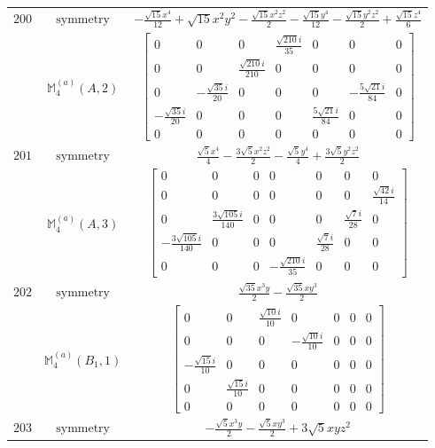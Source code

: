 \documentclass[fleqn,8pt,landscape]{jsarticle}
\begin{document}
\begin{longtable}{ccc}
$ 200 $ & $ \text{symmetry} $ & $ - \frac{\sqrt{15} x^{4}}{12} + \sqrt{15} x^{2} y^{2} - \frac{\sqrt{15} x^{2} z^{2}}{2} - \frac{\sqrt{15} y^{4}}{12} - \frac{\sqrt{15} y^{2} z^{2}}{2} + \frac{\sqrt{15} z^{4}}{6} $ \\
$  $ & $ \mathbb{M}_{4}^{(a)}(A,2) $ & $ \begin{bmatrix} 0 & 0 & 0 & \frac{\sqrt{210} i}{35} & 0 & 0 & 0 \\ 0 & 0 & \frac{\sqrt{210} i}{210} & 0 & 0 & 0 & 0 \\ 0 & - \frac{\sqrt{35} i}{20} & 0 & 0 & 0 & - \frac{5 \sqrt{21} i}{84} & 0 \\ - \frac{\sqrt{35} i}{20} & 0 & 0 & 0 & \frac{5 \sqrt{21} i}{84} & 0 & 0 \\ 0 & 0 & 0 & 0 & 0 & 0 & 0 \end{bmatrix} $ \\ \hline
$ 201 $ & $ \text{symmetry} $ & $ \frac{\sqrt{5} x^{4}}{4} - \frac{3 \sqrt{5} x^{2} z^{2}}{2} - \frac{\sqrt{5} y^{4}}{4} + \frac{3 \sqrt{5} y^{2} z^{2}}{2} $ \\
$  $ & $ \mathbb{M}_{4}^{(a)}(A,3) $ & $ \begin{bmatrix} 0 & 0 & 0 & 0 & 0 & 0 & 0 \\ 0 & 0 & 0 & 0 & 0 & 0 & \frac{\sqrt{42} i}{14} \\ 0 & \frac{3 \sqrt{105} i}{140} & 0 & 0 & 0 & \frac{\sqrt{7} i}{28} & 0 \\ - \frac{3 \sqrt{105} i}{140} & 0 & 0 & 0 & \frac{\sqrt{7} i}{28} & 0 & 0 \\ 0 & 0 & 0 & - \frac{\sqrt{210} i}{35} & 0 & 0 & 0 \end{bmatrix} $ \\ \hline
$ 202 $ & $ \text{symmetry} $ & $ \frac{\sqrt{35} x^{3} y}{2} - \frac{\sqrt{35} x y^{3}}{2} $ \\
$  $ & $ \mathbb{M}_{4}^{(a)}(B_{1},1) $ & $ \begin{bmatrix} 0 & 0 & \frac{\sqrt{10} i}{10} & 0 & 0 & 0 & 0 \\ 0 & 0 & 0 & - \frac{\sqrt{10} i}{10} & 0 & 0 & 0 \\ - \frac{\sqrt{15} i}{10} & 0 & 0 & 0 & 0 & 0 & 0 \\ 0 & \frac{\sqrt{15} i}{10} & 0 & 0 & 0 & 0 & 0 \\ 0 & 0 & 0 & 0 & 0 & 0 & 0 \end{bmatrix} $ \\ \hline
$ 203 $ & $ \text{symmetry} $ & $ - \frac{\sqrt{5} x^{3} y}{2} - \frac{\sqrt{5} x y^{3}}{2} + 3 \sqrt{5} x y z^{2} $ \\

\end{longtable}
\end{document}
